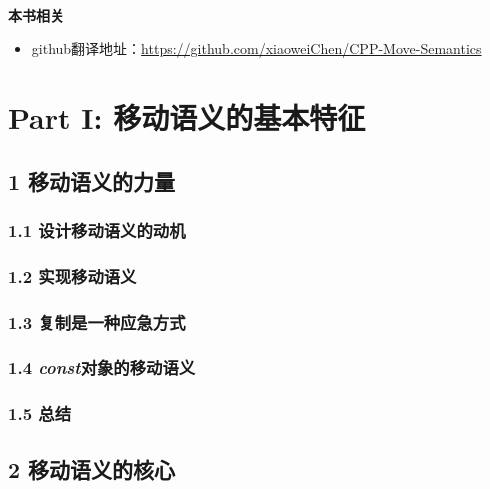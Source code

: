 \documentclass[11pt,a4paper,UTF8]{ctexart}
\begin{document}
	\hspace*{\fill} \\ %
	\noindent\textbf{本书相关}\ \par
	\begin{itemize}
		\item github翻译地址：\href{https://github.com/xiaoweiChen/CPP-Move-Semantics}{https://github.com/xiaoweiChen/CPP-Move-Semantics}
	\end{itemize}
	\newpage
	
	\tableofcontents
	\newpage
	
	\pagestyle{empty}
	
	

	\section{Part I: 移动语义的基本特征}
	
	\subsection{1 移动语义的力量}
	
		\subsubsection{1.1 设计移动语义的动机}
		
		\subsubsection{1.2 实现移动语义}
		
		\subsubsection{1.3 复制是一种应急方式}
		
		\subsubsection{1.4 \textit{const}对象的移动语义}
		
		\subsubsection{1.5 总结}
		
	\subsection{2 移动语义的核心}
	
\end{document}

